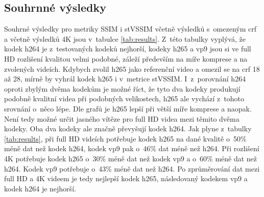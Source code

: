 \documentclass[thesis=M,czech]{FITthesis}[2016/06/26]
\begin{document}
\subsection{Souhrnné výsledky}
Souhrné výsledky pro metriky SSIM i stVSSIM včetně výsledků s~omezeným crf a včetně výsledků 4K jsou v~tabulce \ref{tab:results}. Z~této tabulky vyplývá, že kodek h264 je z~testovaných kodeků nejhorší, kodeky h265 a vp9 jsou si ve full HD rozlišení kvalitou velmi podobné, záleží především na míře komprese a na zvolených videích. Kdybych zvolil h265 jako referenční video a omezil se na crf 18 až 28, mírně by vyhrál kodek h265 i v~metrice stVSSIM. I~z~porovnání h264 oproti zbylým dvěma kodekům je možné říct, že tyto dva kodeky produkují podobně kvalitní videa při podobných velikostech, h265 ale vychází z~tohoto srovnání o~něco lépe. Dle grafů je h265 lepší při větší míře komprese a naopak. Není tedy možné určit jasného vítěze pro full HD videa mezi těmito dvěma kodeky. Oba dva kodeky ale značně převyšují kodek h264. Jak plyne z~tabulky \ref{tab:results}, při full HD videích potřebuje kodek h265 na dané kvalitě o~50\% méně dat než kodek h264, kodek vp9 pak o~46\% dat méně než h264. Při rozlišení 4K potřebuje kodek h265 o~30\% méně dat než kodek vp9 a o~60\% méně dat než h264. Kodek vp9 potřebuje o~43\% méně dat než h264. Po zprůměrování dat mezi full HD a 4K videem je tedy nejlepší kodek h265, následovaný kodekem vp9 a kodek h264 je nejhorší.  
\end{document}
